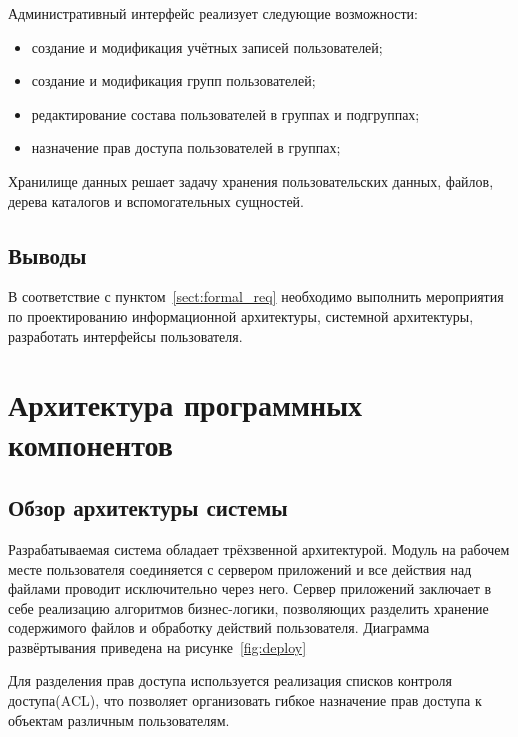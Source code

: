 \documentclass[utf8,usehyperref,12pt]{G7-32}
\begin{document}
Административный интерфейс реализует следующие возможности:

\begin{itemize}
	\item создание и модификация учётных записей пользователей;
	\item создание и модификация групп пользователей;
	\item редактирование состава пользователей в группах и подгруппах;
	\item назначение прав доступа пользователей в группах;
\end{itemize}

Хранилище данных решает задачу хранения пользовательских данных, файлов, дерева каталогов и вспомогательных сущностей.

\subsection{Выводы}
В соответствие с пунктом~\ref{sect:formal_req} необходимо выполнить мероприятия по проектированию информационной архитектуры, системной архитектуры, разработать интерфейсы пользователя.

\section{Архитектура программных компонентов}
\subsection{Обзор архитектуры системы}

Разрабатываемая система обладает трёхзвенной архитектурой. Модуль на рабочем месте пользователя соединяется с сервером приложений и все действия над файлами проводит исключительно через него. Сервер приложений заключает в себе реализацию алгоритмов бизнес-логики, позволяющих разделить хранение содержимого файлов и обработку действий пользователя. Диаграмма развёртывания приведена на рисунке~\ref{fig:deploy}

Для разделения прав доступа используется реализация списков контроля доступа(ACL)\cite{wiki_acl}, что позволяет организовать гибкое назначение прав доступа к объектам различным пользователям. 
\end{document}
